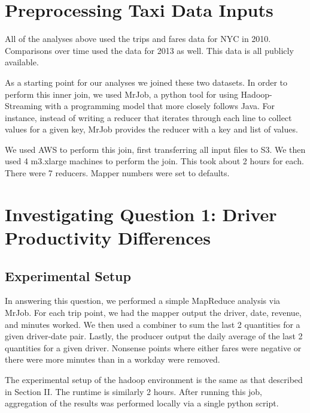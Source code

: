 \documentclass[twoside]{article}
\begin{document}
\begin{multicols}{2}
\section{Preprocessing Taxi Data Inputs}

All of the analyses above used the trips and fares data for NYC in 2010. Comparisons over time used the data for 2013 as well. This data is all publicly available. 

As a starting point for our analyses we joined these two datasets. In order to perform this inner join, we used MrJob, a python tool for using Hadoop-Streaming with a programming model that more closely follows Java. For instance, instead of writing a reducer that iterates through each line to collect values for a given key, MrJob provides the reducer with a key and list of values. 

We used AWS to perform this join, first transferring all input files to S3. We then used 4 m3.xlarge machines to perform the join. This took about 2 hours for each. There were 7 reducers. Mapper numbers were set to defaults. 


\section{Investigating Question 1: Driver Productivity Differences}

\subsection{Experimental Setup}
In answering this question, we performed a simple MapReduce analysis via MrJob. For each trip point, we had the mapper output the driver, date, revenue, and minutes worked. We then used a combiner to sum the last 2 quantities for a given driver-date pair.  Lastly, the producer output the daily average of the last 2 quantities for a given driver. Nonsense points where either fares were negative or there were more minutes than in a workday were removed. 

The experimental setup of the hadoop environment is the same as that described in Section II. The runtime is similarly 2 hours. After running this job, aggregation of the results was performed locally via a single python script.


\end{multicols}
\end{document}
